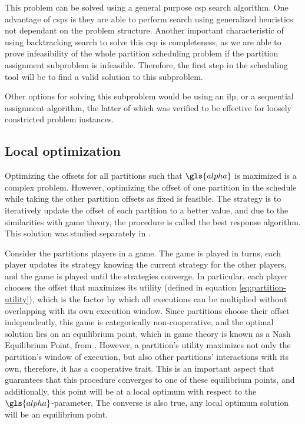 \documentclass[main.tex]{subfiles}
\begin{document}
This problem can be solved using a general purpose \gls{csp} search algorithm.
One advantage of \glspl{csp} is they are able to perform search using generalized heuristics not dependant on the problem structure.
Another important characteristic of using backtracking search to solve this \gls{csp} is completeness, as we are able to prove infeasibility of the whole partition scheduling problem if the partition assignment subproblem is infeasible.
Therefore, the first step in the scheduling tool will be to find a valid solution to this subproblem.

Other options for solving this subproblem would be using an \gls{ilp}, or a sequential assignment algorithm, the latter of which was verified to be effective for loosely constricted problem instances.

\subsection{Local optimization}
\label{sec:local-op}

Optimizing the offsets for all partitions such that $\gls{alpha}$ is maximized is a complex problem.
However, optimizing the offset of one partition in the schedule while taking the other partition offsets as fixed is feasible.
The strategy is to iteratively update the offset of each partition to a better value, and due to the similarities with game theory, the procedure is called the best response algorithm.
This solution was studied separately in \cite{al2012strictly, pira2016line}.

Consider the partitions players in a game.
The game is played in turns, each player updates its strategy knowing the current strategy for the other players, and the game is played until the strategies converge.
In particular, each player chooses the offset that maximizes its utility (defined in equation \ref{eq:partition-utility}), which is the factor by which all executions can be multiplied without overlapping with its own execution window.
Since partitions choose their offset independently, this game is categorically non-cooperative, and the optimal solution lies on an equilibrium point, which in game theory is known as a Nash Equilibrium Point, from \textcite{nash1951non}.
However, a partition's utility maximizes not only the partition's window of execution, but also other partitions' interactions with its own, therefore, it has a cooperative trait.
This is an important aspect that guarantees that this procedure converges to one of these equilibrium points, and additionally, this point will be at a local optimum with respect to the $\gls{alpha}$-parameter.
The converse is also true, any local optimum solution will be an equilibrium point.
\end{document}
